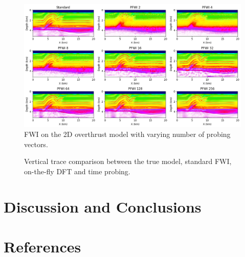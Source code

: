 \documentclass[]{segabs}
\begin{document}
\begin{figure}
\centering
\includegraphics[width=1.000\hsize]{./figures/probed_fwi.png}
\caption*{FWI on the 2D overthrust model with varying number of probing
vectors.}
\end{figure}

\begin{figure}
\centering
\captionsetup[subfigure]{labelformat=empty}
\caption*{Vertical trace comparison between the true model, standard
FWI, on-the-fly DFT and time probing.}
\end{figure}

\section{Discussion and Conclusions}\label{discussion-and-conclusions}

\section{References}\label{references}


\end{document}
